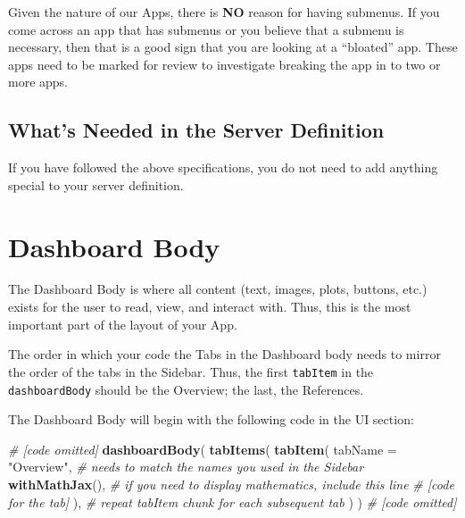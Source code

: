 \documentclass[
]{book}
\newenvironment{Shaded}{\begin{snugshade}}{\end{snugshade}}
\newcommand{\CommentTok}[1]{\textcolor[rgb]{0.56,0.35,0.01}{\textit{#1}}}
\newcommand{\DataTypeTok}[1]{\textcolor[rgb]{0.13,0.29,0.53}{#1}}
\newcommand{\KeywordTok}[1]{\textcolor[rgb]{0.13,0.29,0.53}{\textbf{#1}}}
\newcommand{\NormalTok}[1]{#1}
\newcommand{\StringTok}[1]{\textcolor[rgb]{0.31,0.60,0.02}{#1}}
\begin{document}
Given the nature of our Apps, there is \textbf{NO} reason for having submenus. If you come across an app that has submenus or you believe that a submenu is necessary, then that is a good sign that you are looking at a ``bloated'' app. These apps need to be marked for review to investigate breaking the app in to two or more apps.

\hypertarget{whats-needed-in-the-server-definition-1}{%
\subsection{What's Needed in the Server Definition}\label{whats-needed-in-the-server-definition-1}}

If you have followed the above specifications, you do not need to add anything special to your server definition.

\hypertarget{body}{%
\section{Dashboard Body}\label{body}}

The Dashboard Body is where all content (text, images, plots, buttons, etc.) exists for the user to read, view, and interact with. Thus, this is the most important part of the layout of your App.

The order in which your code the Tabs in the Dashboard body needs to mirror the order of the tabs in the Sidebar. Thus, the first \texttt{tabItem} in the \texttt{dashboardBody} should be the Overview; the last, the References.

The Dashboard Body will begin with the following code in the UI section:

\begin{Shaded}
\begin{Highlighting}[]
\CommentTok{# [code omitted]}
\KeywordTok{dashboardBody}\NormalTok{(}
  \KeywordTok{tabItems}\NormalTok{(}
    \KeywordTok{tabItem}\NormalTok{(}
      \DataTypeTok{tabName =} \StringTok{"Overview"}\NormalTok{, }\CommentTok{# needs to match the names you used in the Sidebar}
      \KeywordTok{withMathJax}\NormalTok{(), }\CommentTok{# if you need to display mathematics, include this line}
      \CommentTok{# [code for the tab]}
\NormalTok{    ),}
    \CommentTok{# repeat tabItem chunk for each subsequent tab}
\NormalTok{  )}
\NormalTok{)}
\CommentTok{# [code omitted]}
\end{Highlighting}
\end{Shaded}
\end{document}

